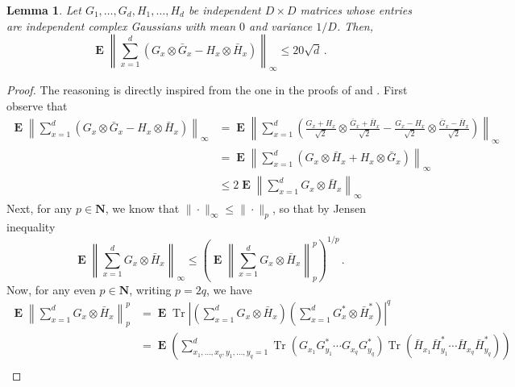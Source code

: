 \documentclass{amsart}
\newtheorem{lemma}[theorem]{Lemma}
\newcommand{\N}{\mathbf{N}}
\renewcommand{\leq}{\leqslant}
\DeclareMathOperator{\Tr}{Tr}
\DeclareMathOperator{\E}{\mathbf{E}}
\begin{document}
\begin{lemma} \label{lem:norm-sym}
    Let $G_1,\ldots,G_d,H_1,\ldots,H_d$ be independent $D\times D$ matrices whose entries are independent complex Gaussians with mean $0$ and variance $1/D$. Then,
    \[ \E \left\| \sum_{x=1}^d \left( G_x\otimes\bar{G}_x - H_x\otimes\bar{H}_x \right) \right\|_{\infty} \leq 20\sqrt{d} \, .  \]
\end{lemma}

\begin{proof}
    The reasoning is directly inspired from the one in the proofs of \cite[Lemma 4.1 and Theorem 4.2]{Pis2} and \cite[Theorem 16.6]{Pis1}.
    First observe that
    \begin{align*}
        \E \left\| \sum_{x=1}^d \left( G_{x}\otimes\bar{G}_{x} - H_{x}\otimes\bar{H}_{x} \right) \right\|_{\infty} & = \E \left\| \sum_{x=1}^d \left( \frac{G_x+H_x}{\sqrt{2}}\otimes \frac{\bar{G}_x+\bar{H}_x}{\sqrt{2}} - \frac{G_x-H_x}{\sqrt{2}}\otimes \frac{\bar{G}_x-\bar{H}_x}{\sqrt{2}} \right) \right\|_{\infty} \\
                                                                                                                   & = \E \left\| \sum_{x=1}^d \left( G_{x}\otimes\bar{H}_{x} + H_{x}\otimes\bar{G}_{x} \right) \right\|_{\infty}                                                                                           \\
                                                                                                                   & \leq 2 \E \left\| \sum_{x=1}^d G_{x}\otimes\bar{H}_{x} \right\|_{\infty}
    \end{align*}
    Next, for any $p\in\N$, we know that $\|\cdot\|_{\infty} \leq \|\cdot\|_p$, so that by Jensen inequality
    \[ \E \left\| \sum_{x=1}^d G_{x}\otimes\bar{H}_{x} \right\|_{\infty} \leq \left(\E \left\| \sum_{x=1}^d G_{x}\otimes\bar{H}_{x} \right\|^p_p \right)^{1/p} \, . \]
    Now, for any even $p\in\N$, writing $p=2q$, we have
    \begin{align*}
        \E \left\| \sum_{x=1}^d G_{x}\otimes\bar{H}_{x} \right\|^p_p & = \E \Tr \left| \left(\sum_{x=1}^d G_{x}\otimes\bar{H}_{x}\right) \left(\sum_{x=1}^d G_{x}^*\otimes\bar{H}_{x}^*\right) \right|^q                                                                     \\
                                                                     & = \E \left( \sum_{x_1,\ldots,x_q,y_1,\ldots,y_q=1}^d \Tr \left(G_{x_1}G^*_{y_1}\cdots G_{x_q}G^*_{y_q}\right) \Tr\left(\bar{H}_{x_1}\bar{H}^*_{y_1}\cdots \bar{H}_{x_q}\bar{H}^*_{y_q}\right) \right) \\

\end{align*}
\end{proof}
\end{document}
